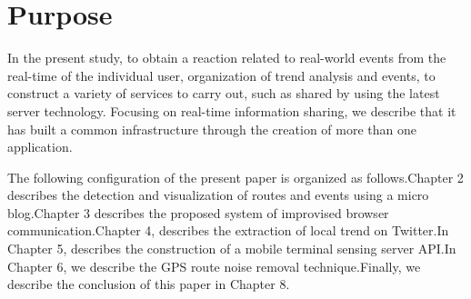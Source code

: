 \section{Purpose}
In the present study, to obtain a reaction related to real-world events from the real-time of the individual user, organization of trend analysis and events, to construct a variety of services to carry out, such as shared by using the latest server technology. Focusing on real-time information sharing, we describe that it has built a common infrastructure through the creation of more than one application.


The following configuration of the present paper is organized as follows.Chapter 2 describes the detection and visualization of routes and events using a micro blog.Chapter 3 describes the proposed system of improvised browser communication.Chapter 4, describes the extraction of local trend on Twitter.In Chapter 5, describes the construction of a mobile terminal sensing server API.In Chapter 6, we describe the GPS route noise removal technique.Finally, we describe the conclusion of this paper in Chapter 8.

